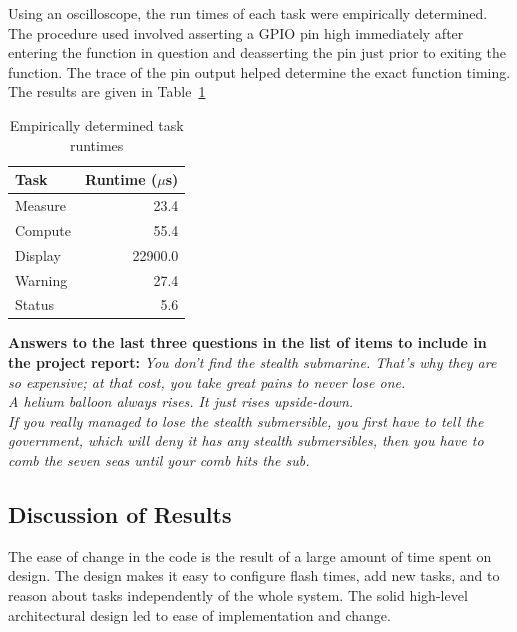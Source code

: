 \documentclass[12pt]{article} %
\begin{document}
    Using an oscilloscope, the run times of each task were empirically
		determined. The procedure used involved asserting a GPIO pin high
		immediately after entering the function in question and deasserting the pin
		just prior to exiting the function. The trace of the pin output helped
		determine the exact function timing. The results are given in
		Table~\ref{tab:taskRuntimes}

    \begin{table}[h]
      \centering
      \begin{tabular}{|l|r|} 
	\hline
	Task & Runtime ($\mu$s) \\ \hline
	Measure & 23.4 \\ \hline
	Compute & 55.4 \\ \hline
	Display & 22900.0 \\ \hline
	Warning & 27.4 \\ \hline
	Status & 5.6 \\ \hline
      \end{tabular}
      \caption{Empirically determined task runtimes}
      \label{tab:taskRuntimes}
    \end{table}

    \textbf{Answers to the last three questions in the list of items to include
    in the project report:}
    \emph{You don't find the stealth submarine. That's why they are so expensive; at that cost, you take great pains to never lose one.\\  A helium balloon always rises. It just rises upside-down. \\ If you really managed to lose the stealth submersible, you first have to tell the government, which will deny it has any stealth submersibles, then you have to comb the seven seas until your comb hits the sub.}

    \subsection{Discussion of Results}
    The ease of change in the code is the result of a large amount of time spent on
    design. The design makes it easy to configure flash times, add new tasks, and
    to reason about tasks independently of the whole system. The solid high-level
    architectural design led to ease of implementation and change.
\end{document}

